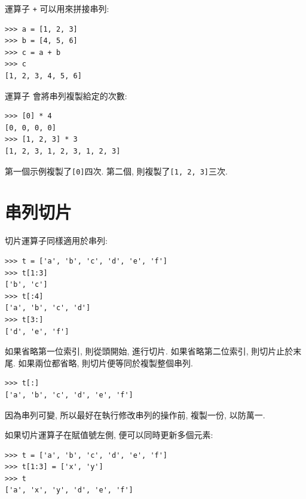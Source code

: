 \documentclass[10pt]{book}
\begin{document}
運算子 {\tt +} 可以用來拼接串列:

\begin{verbatim}
>>> a = [1, 2, 3]
>>> b = [4, 5, 6]
>>> c = a + b
>>> c
[1, 2, 3, 4, 5, 6]
\end{verbatim}
%

運算子 {\tt *} 會將串列複製給定的次數:

\begin{verbatim}
>>> [0] * 4
[0, 0, 0, 0]
>>> [1, 2, 3] * 3
[1, 2, 3, 1, 2, 3, 1, 2, 3]
\end{verbatim}
%
第一個示例複製了{\tt [0]}四次. 
第二個, 則複製了{\tt [1, 2, 3]}三次. 


\section{串列切片}

切片運算子同樣適用於串列:

\begin{verbatim}
>>> t = ['a', 'b', 'c', 'd', 'e', 'f']
>>> t[1:3]
['b', 'c']
>>> t[:4]
['a', 'b', 'c', 'd']
>>> t[3:]
['d', 'e', 'f']
\end{verbatim}
%
如果省略第一位索引, 則從頭開始, 進行切片. 
如果省略第二位索引, 則切片止於末尾. 
如果兩位都省略, 則切片便等同於複製整個串列. 

\begin{verbatim}
>>> t[:]
['a', 'b', 'c', 'd', 'e', 'f']
\end{verbatim}
%
因為串列可變, 所以最好在執行修改串列的操作前, 複製一份, 以防萬一. 

如果切片運算子在賦值號左側, 便可以同時更新多個元素:

\begin{verbatim}
>>> t = ['a', 'b', 'c', 'd', 'e', 'f']
>>> t[1:3] = ['x', 'y']
>>> t
['a', 'x', 'y', 'd', 'e', 'f']
\end{verbatim}
%


%
\end{document}
